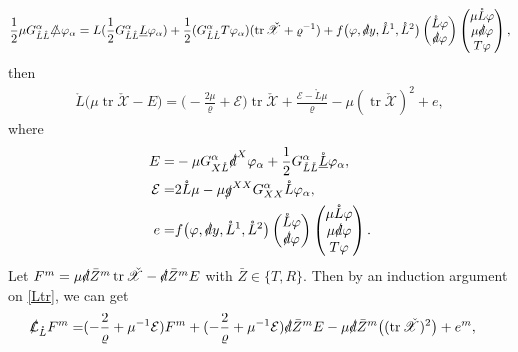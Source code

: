 \documentclass[11pt,twoside]{article}
\def\al{\alpha}
\def\vp{\varphi}
\def\f{\frac}
\begin{document}
\begin{equation*}
\begin{split}
\f12\mu G_{\mathring L\mathring L}^\al\slashed\triangle\vp_\al=L(\f12G_{\mathring L\mathring L}^\al\underline L\vp_\al)+\f12(G_{\mathring L\mathring L}^\al T\vp_\al)(\operatorname{tr}\check{\mathscr X}+\varrho^{-1})+f\bigl(\varphi, \slashed{d}y, \mathring{L}^1, \mathring{L}^2\bigr)
\begin{pmatrix} \mathring{L}\varphi \\ \slashed{d}\varphi \end{pmatrix}\begin{pmatrix} \mu\mathring{L}\varphi \\ \mu\slashed{d}\varphi\\T\vp \end{pmatrix},
\end{split}
\end{equation*}
then
\begin{equation}\label{Ltr}
\begin{split}
\mathring L\big(\mu\operatorname{tr}\check{\mathscr X}-E)=\big(-\f{2\mu}{\varrho}+\mathcal E\big)\operatorname{tr}\check{\mathscr X}+\f{\mathcal E-\mathring L\mu}{\varrho}-\mu(\operatorname{tr}\check{\mathscr X})^2+e,
\end{split}
\end{equation}
where
\begin{equation}\label{Ee}
\begin{split}
E=&-\mu G_{X\mathring L}^\al\slashed d^X\varphi_\al+\f12G_{\mathring L\mathring L}^\al\mathring{\underline L}\varphi_\al,\\
\mathcal E=&2\mathring L\mu-\mu\slashed g^{XX}G_{XX}^\al\mathring L\vp_\al,\\
e=&f\bigl(\varphi, \slashed{d}y, \mathring{L}^1, \mathring{L}^2\bigr)\begin{pmatrix} \mathring{L}\varphi \\ \slashed{d}\varphi \end{pmatrix}\begin{pmatrix} \mu\mathring{L}\varphi \\ \mu\slashed{d}\varphi\\T\vp \end{pmatrix}.
\end{split}
\end{equation}
Let $F^m=\mu\slashed d\bar Z^m\operatorname{tr}\check{\mathscr X}-\slashed d\bar Z^m E$ with $\bar Z\in\{T,R\}$. Then by an induction
argument on \eqref{Ltr}, we can get
\begin{equation}\label{LFal}
\begin{split}
\slashed{\mathcal L}_{\mathring L}F^m=&(-\f{2}{\varrho}+\mu^{-1}\mathcal E)F^m+(-\f{2}{\varrho}+\mu^{-1}\mathcal E)\slashed d\bar Z^m E-\mu\slashed d\bar Z^{m}\bigl((\operatorname{tr}\check{\mathscr X})^2\bigr)+e^m,
\end{split}
\end{equation}
\end{document}
